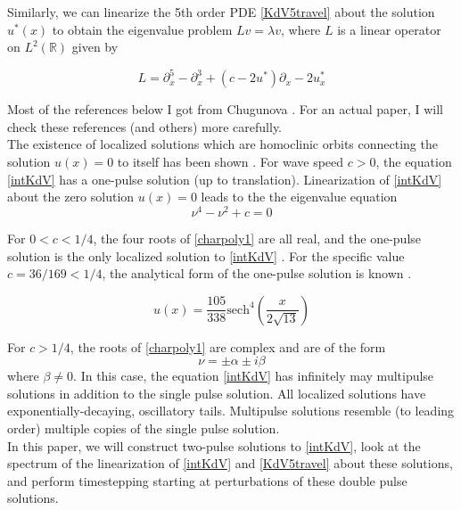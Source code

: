 \documentclass[12pt]{article}
\def\R{{\mathbb R}}
\begin{document}
Similarly, we can linearize the 5th order PDE \eqref{KdV5travel} about the solution $u^*(x)$ to obtain the eigenvalue problem $Lv = \lambda v$, where $L$ is a linear operator on $L^2(\R)$ given by

\begin{equation}\label{linear5th}
L = \partial_x^5 - \partial_x^3 + (c - 2 u^*) \partial_x - 2 u^*_x
\end{equation}

Most of the references below I got from Chugunova \cite{Pelinovsky2007}. For an actual paper, I will check these references (and others) more carefully.\\

The existence of localized solutions which are homoclinic orbits connecting the solution $u(x) = 0$ to itself has been shown \cite{Champneys1998}. For wave speed $c > 0$, the equation \eqref{intKdV} has a one-pulse solution (up to translation). Linearization of \eqref{intKdV} about the zero solution $u(x) = 0$ leads to the the eigenvalue equation
\begin{equation} \label{charpoly1}
\nu^4 - \nu^2 + c = 0
\end{equation}

For $0 < c < 1/4$, the four roots of \eqref{charpoly1} are all real, and the one-pulse solution is the only localized solution to \eqref{intKdV} \cite{Groves1997}. For the specific value $c = 36/169 < 1/4$, the analytical form of the one-pulse solution is known \cite{Pelinovsky2007}.

\begin{equation} \label{exact}
u(x) = \frac{105}{338}\textrm{sech}^4\left(\frac{x}{2\sqrt{13}} \right)
\end{equation}

For $c > 1/4$, the roots of \eqref{charpoly1} are complex and are of the form
\begin{equation} \label{alphabeta}
\nu = \pm \alpha \pm i \beta
\end{equation}
where $\beta \neq 0$. In this case, the equation \eqref{intKdV} has infinitely may multipulse solutions in addition to the single pulse solution. All localized solutions have  exponentially-decaying, oscillatory tails. Multipulse solutions resemble (to leading order) multiple copies of the single pulse solution.\\

In this paper, we will construct two-pulse solutions to \eqref{intKdV}, look at the spectrum of the linearization of \eqref{intKdV} and \eqref{KdV5travel} about these solutions, and perform timestepping starting at perturbations of these double pulse solutions.
\end{document}
